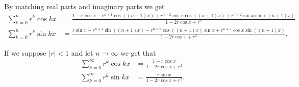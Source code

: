 \documentclass[notitlepage]{simple}
\begin{document}
By matching real parts and imaginary parts we get
\begin{align*}
	\sum_{k=0}^n r^k\cos kx &= \frac{1-r\cos x-r^{n+1}\cos((n+1)x)+r^{n+2}\cos x\cos((n+1)x)+r^{n+2}\sin x\sin((n+1)x)}{1-2r\cos x +r^2}\\
	\sum_{k=0}^n r^k\sin kx &= \frac{r\sin x -r^{n+1}\sin((n+1)x)-r^{n+2}\cos((n+1)x)\sin x +r^{n+2}\cos x\sin((n+1)x)}{1-2r\cos x +r^2}.
\end{align*}

If we suppose $|r|<1$ and let $n\rightarrow\infty$ we get that
\begin{align*}
	\sum_{k=0}^\infty r^k\cos kx &= \frac{1-r\cos x}{1-2r\cos x +r^2}\\
	\sum_{k=0}^\infty r^k\sin kx &= \frac{r\sin x}{1-2r\cos x +r^2}.
\end{align*}
\end{document}
